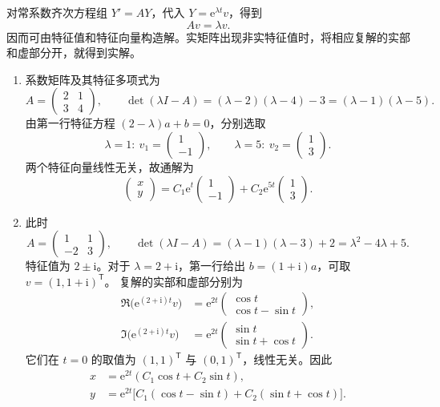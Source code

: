 \documentclass[UTF8,a4paper,11pt]{ctexart}
\newcommand{\e}{\mathrm e}
\begin{document}
\begin{solution}
对常系数齐次方程组 $Y'=AY$，代入 $Y=\e^{\lambda t}v$，得到
\[
Av=\lambda v.
\]
因而可由特征值和特征向量构造解。实矩阵出现非实特征值时，将相应复解的实部和虚部分开，就得到实解。

\begin{enumerate}[label=(\arabic*)]
\item 系数矩阵及其特征多项式为
\[
A=\begin{pmatrix}2&1\\3&4\end{pmatrix},\qquad
\det(\lambda I-A)=(\lambda-2)(\lambda-4)-3
=(\lambda-1)(\lambda-5).
\]
由第一行特征方程 $(2-\lambda)a+b=0$，分别选取
\[
\lambda=1:\ v_1=\begin{pmatrix}1\\-1\end{pmatrix},\qquad
\lambda=5:\ v_2=\begin{pmatrix}1\\3\end{pmatrix}.
\]
两个特征向量线性无关，故通解为
\[
\boxed{
\begin{pmatrix}x\\y\end{pmatrix}
=C_1\e^t\begin{pmatrix}1\\-1\end{pmatrix}
+C_2\e^{5t}\begin{pmatrix}1\\3\end{pmatrix}.}
\]

\item 此时
\[
A=\begin{pmatrix}1&1\\-2&3\end{pmatrix},\qquad
\det(\lambda I-A)=(\lambda-1)(\lambda-3)+2
=\lambda^2-4\lambda+5.
\]
特征值为 $2\pm\mathrm i$。对于 $\lambda=2+\mathrm i$，第一行给出
$b=(1+\mathrm i)a$，可取 $v=(1,1+\mathrm i)^{\mathsf T}$。
复解的实部和虚部分别为
\[
\begin{aligned}
\Re\bigl(\e^{(2+\mathrm i)t}v\bigr)
&=\e^{2t}\begin{pmatrix}\cos t\\\cos t-\sin t\end{pmatrix},\\[4pt]
\Im\bigl(\e^{(2+\mathrm i)t}v\bigr)
&=\e^{2t}\begin{pmatrix}\sin t\\\sin t+\cos t\end{pmatrix}.
\end{aligned}
\]
它们在 $t=0$ 的取值为 $(1,1)^{\mathsf T}$ 与 $(0,1)^{\mathsf T}$，线性无关。因此
\[
\boxed{
\begin{aligned}
x&=\e^{2t}(C_1\cos t+C_2\sin t),\\
y&=\e^{2t}\bigl[C_1(\cos t-\sin t)+C_2(\sin t+\cos t)\bigr].
\end{aligned}}
\]


\end{enumerate}
\end{solution}
\end{document}
